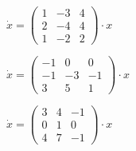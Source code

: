 \begin{multicols}{3}
\begin{enumtasks}
			\item \( \dot{x} = \begin{pmatrix} 1 & -3 & 4 \\ 2 & -4 & 4 \\ 1 & -2 & 2 \end{pmatrix} \cdot x \) %
			\item \( \dot{x} = \begin{pmatrix} -1 & 0 & 0 \\ -1 & -3 & -1 \\ 3 & 5 & 1 \end{pmatrix} \cdot x \) %
			\item \( \dot{x} = \begin{pmatrix} 3 & 4 & -1 \\ 0 & 1 & 0 \\ 4 & 7 & -1 \end{pmatrix} \cdot x \) %

\end{enumtasks}
\end{multicols}
